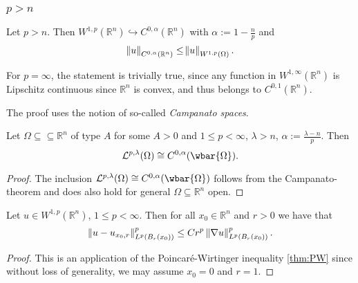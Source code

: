 \subsubsection*{$p > n$}

\begin{theorem}
	Let $p > n$. Then $W^{1,p}(\mathbb{R}^n) \hookrightarrow C^{0,\alpha}(\mathbb{R}^n)$ with $\alpha := 1 - \frac{n}{p}$ and
	\begin{equation*}
		\norm[0]{u}_{C^{0,\alpha}(\mathbb{R}^n)} \leq \norm{u}_{W^{1,p}(\Omega)}.
	\end{equation*}
\end{theorem}

\begin{remark}
	For $p = \infty$, the statement is trivially true, since any function in $W^{1,\infty}(\mathbb{R}^n)$ is Lipschitz continuous since $\mathbb{R}^n$ is convex, and thus belongs to $C^{0,1}(\mathbb{R}^n)$.
\end{remark}

The proof uses the notion of so-called \emph{Campanato spaces}. 

\begin{theorem}
	Let $\Omega \subseteq \subseteq \mathbb{R}^n$ of type $A$ for some $A > 0$ and $1 \leq p < \infty$, $\lambda > n$, $\alpha := \frac{\lambda - n}{p}$. Then
	\begin{equation*}
		\mathcal{L}^{p,\lambda}(\Omega) \cong C^{0,\alpha}(\wbar{\Omega}).
	\end{equation*}
\end{theorem}

\begin{proof}
	The inclusion $\mathcal{L}^{p,\lambda}(\Omega) \cong C^{0,\alpha}(\wbar{\Omega})$ follows from the Campanato-theorem and does also hold for general $\Omega \subseteq \mathbb{R}^n$ open.
\end{proof}

\begin{lemma}
	Let $u \in W^{1,p}(\mathbb{R}^n)$, $1 \leq p < \infty$. Then for all $x_0 \in \mathbb{R}^n$ and $r > 0$ we have that
	\begin{equation*}
		\norm[0]{u - u_{x_0,r}}_{L^p(B_r(x_0))}^p \leq Cr^p \norm[0]{\nabla u}^p_{L^p(B_r(x_0))}.
	\end{equation*}
\end{lemma}

\begin{proof}
	This is an application of the Poincar\'e-Wirtinger inequality \ref{thm:PW} since without loss of generality, we may assume $x_0 = 0$ and $r = 1$.
\end{proof}

